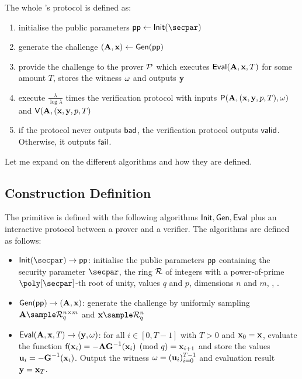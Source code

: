 The whole \PoSW's protocol is defined as:

\begin{enumerate}
	\item initialise the public parameters $\pp \gets \init(\secpar)$
	\item generate the challenge $(\vA,\vx) \gets \gen(\pp)$
	\item provide the challenge to the prover $\mathcal{P}$ which executes $\eval(\vA,\vx,T)$ for
		some amount $T$, stores the witness $\witness$ and outputs $\vy$
	\item execute $\frac{\lambda}{\log{\lambda}}$ times the verification protocol with inputs
		$\prove(\vA,(\vx,\vy,\pprime,T),\witness)$ and $\verify(\vA,(\vx,\vy,\pprime,T)$
	\item if the protocol never outputs $\textsf{bad}$,
		the verification protocol outputs $\textsf{valid}$.
		Otherwise, it outputs $\textsf{fail}$.
\end{enumerate}

\noindent
Let me expand on the different algorithms and how they are defined.

\subsection{Construction Definition}
The primitive is defined with the following algorithms $\textsf{Init}, \textsf{Gen}, \textsf{Eval}$ plus an interactive
protocol between a prover and a verifier.
%
The algorithms are defined as follows:
\begin{itemize}
	\item $\init(\secpar) \to \pp$: initialise the public parameters $\pp$ containing 
		the security parameter $\secpar$, the ring $\Rring$ of integers with a power-of-prime
		$\poly[\secpar]$-th root of unity, values $q$ and $p$, dimensions $n$ and $m$,
		, %
		.
	
	\item $\gen(\pp) \to (\vA,\vx)$: generate the challenge by uniformly sampling
		$\vA \sample \Rring[q]^{n \times m}$ and $\vx \sample \Rring[q]^{n}$
	
	\item $\eval(\vA,\vx,T) \to (\vy, \witness)$: for all $i \in [0,T-1]$ with $T > 0$ and
		$\vx[0] = \vx$, evaluate the function $\ffun{\vx[i]} = - \vA\vGi(\vx[i]) \pmod{q} = \vx[i+1]$
		and store the values $\vu[i] = -\vGi(\vx[i])$.
		Output the witness $\witness = (\vu[i])_{i=0}^{T-1}$ and evaluation result $\vy = \vx[T]$.
\end{itemize}

